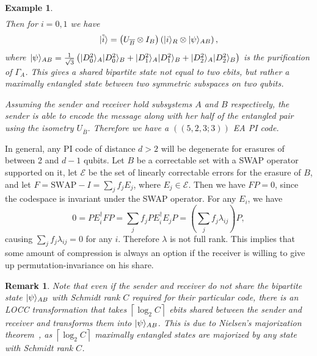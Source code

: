 \documentclass[]{amsart}
\DeclarePairedDelimiter\ket{\lvert}{\rangle}
\newtheorem{example}[theorem]{Example}
\newtheorem{remark}[theorem]{Remark}
\begin{document}
\begin{example}
\begin{equation*}
\begin{array}{cccc}
        \end{array}
    \end{equation*}
    Then for $i=0,1$ we have
    \begin{equation*}
        \ket{\tilde{i}}=\left(U_{\overline{B}}\otimes I_B\right)\left(\ket{i}_R\otimes\ket{\psi}_{AB}\right),
    \end{equation*}
    where $\ket{\psi}_{AB}=\frac{1}{\sqrt{3}}\left(\ket{D_0^2}_A\ket{D_0^2}_B+\ket{D_1^2}_A\ket{D_1^2}_B+\ket{D_2^2}_A\ket{D_2^2}_B\right)$ is the purification of $\Gamma_A$.
    This gives a shared bipartite state not equal to two ebits, but rather a maximally entangled state between two symmetric subspaces on two qubits.
    
    Assuming the sender and receiver hold subsystems $A$ and $B$ respectively, the sender is able to encode the message along with her half of the entangled pair using the isometry $U_{\overline{B}}$.
    Therefore we have a $\left(\!\left(5,2,3;3\right)\!\right)$ EA PI code.
\end{example}

In general, any PI code of distance $d>2$ will be degenerate for erasures of between 2 and $d-1$ qubits.
Let $B$ be a correctable set with a SWAP operator supported on it, let $\mathcal{E}$ be the set of linearly correctable errors for the erasure of $B$, and let $F=\mathrm{SWAP}-I=\sum_j f_j E_j$, where $E_j\in\mathcal{E}$.
Then we have $FP=0$, since the codespace is invariant under the SWAP operator.
For any $E_i$, we have
\begin{equation}
    0=PE_i^\dagger FP=\sum_j f_j PE_i^\dagger E_jP=\left(\sum_j f_j \lambda_{ij}\right)P,
\end{equation}
causing $\sum_j f_j \lambda_{ij}=0$ for any $i$.
Therefore $\lambda$ is not full rank.
This implies that some amount of compression is always an option if the receiver is willing to give up permutation-invariance on his share.

\begin{remark}
    Note that even if the sender and receiver do not share the bipartite state $\ket{\psi}_{AB}$ with Schmidt rank $C$ required for their particular code, there is an LOCC transformation that takes $\left\lceil\log_2 C\right\rceil$ ebits shared between the sender and receiver and transforms them into $\ket{\psi}_{AB}$.
    This is due to Nielsen's majorization theorem~\cite[Theorem 1]{Nie1999}, as $\left\lceil\log_2 C\right\rceil$ maximally entangled states are majorized by any state with Schmidt rank $C$.
\end{remark}
\end{document}
